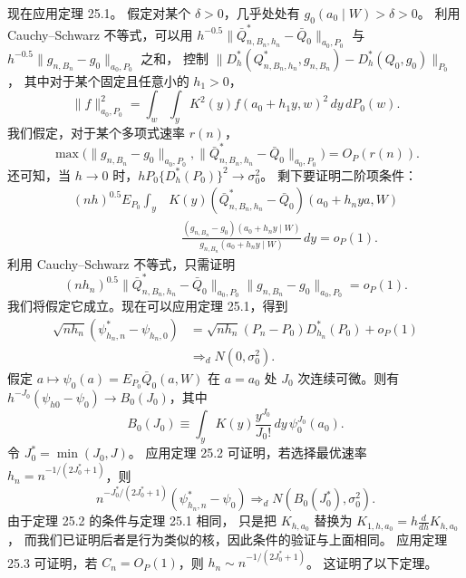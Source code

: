 现在应用定理 25.1。
假定对某个 $\delta>0$，几乎处处有 $g_0(a_0\mid W)>\delta>0$。
利用 Cauchy--Schwarz 不等式，可以用
$h^{-0.5}\|\bar Q^*_{n,B_n,h_n}-\bar Q_0\|_{a_0,P_0}$
与 $h^{-0.5}\|g_{n,B_n}-g_0\|_{a_0,P_0}$ 之和，
控制
$\|D_h^*(Q^*_{n,B_n,h_n},g_{n,B_n})-D_h^*(Q_0,g_0)\|_{P_0}$，
其中对于某个固定且任意小的 $h_1>0$，
\[
 \|f\|_{a_0,P_0}^2
 =\int_w\int_yK^2(y)f(a_0+h_1y,w)^2\,dy\,dP_0(w).
\]
我们假定，对于某个多项式速率 $r(n)$，
\[
 \max\bigl(\|g_{n,B_n}-g_0\|_{a_0,P_0},
 \|\bar Q^*_{n,B_n,h_n}-\bar Q_0\|_{a_0,P_0}\bigr)=O_P(r(n)).
\]
还可知，当 $h\to0$ 时，$hP_0\{D_h^*(P_0)\}^2\to\sigma_0^2$。
剩下要证明二阶项条件：
\[
\begin{aligned}
 (nh)^{0.5}E_{P_0}\int_y
 &K(y)(\bar Q^*_{n,B_n,h_n}-\bar Q_0)(a_0+h_nya,W)\\
 &\quad\frac{(g_{n,B_n}-g_0)(a_0+h_ny\mid W)}
 {g_{n,B_n}(a_0+h_ny\mid W)}\,dy=o_P(1).
\end{aligned}
\]
利用 Cauchy--Schwarz 不等式，只需证明
\[
 (nh_n)^{0.5}
 \|\bar Q^*_{n,B_n,h_n}-\bar Q_0\|_{a_0,P_0}
 \|g_{n,B_n}-g_0\|_{a_0,P_0}=o_P(1).
\]
我们将假定它成立。现在可以应用定理 25.1，得到
\[
\begin{aligned}
 \sqrt{nh_n}(\psi^*_{h_n,n}-\psi_{h_n,0})
 &=\sqrt{nh_n}(P_n-P_0)D_{h_n}^*(P_0)+o_P(1)\\
 &\Rightarrow_dN(0,\sigma_0^2).
\end{aligned}
\]
假定 $a\mapsto\psi_0(a)=E_{P_0}\bar Q_0(a,W)$
在 $a=a_0$ 处 $J_0$ 次连续可微。则有
$h^{-J_0}(\psi_{h0}-\psi_0)\to B_0(J_0)$，其中
\begin{equation}
 B_0(J_0)\equiv\int_yK(y)\frac{y^{J_0}}{J_0!}\,dy\,\psi_0^{J_0}(a_0).
\tag{25.16}
\end{equation}
令 $J_0^*=\min(J_0,J)$。
应用定理 25.2 可证明，若选择最优速率
$h_n=n^{-1/(2J_0^*+1)}$，则
\[
 n^{-J_0^*/(2J_0^*+1)}
 (\psi^*_{h_n,n}-\psi_0)\Rightarrow_dN(B_0(J_0^*),\sigma_0^2).
\]
由于定理 25.2 的条件与定理 25.1 相同，
只是把 $K_{h,a_0}$ 替换为
$K_{1,h,a_0}=h\frac{d}{dh}K_{h,a_0}$，
而我们已证明后者是行为类似的核，因此条件的验证与上面相同。
应用定理 25.3 可证明，若 $C_n=O_P(1)$，则
$h_n\sim n^{-1/(2J_0^*+1)}$。
这证明了以下定理。

